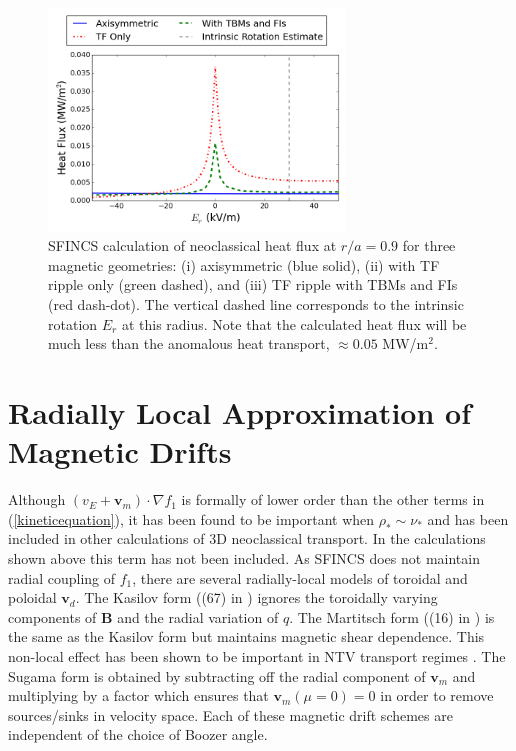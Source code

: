 \documentclass{article}
\begin{document}
\begin{figure}[h!]
\centering
\includegraphics[width=0.7\textwidth]
{HeatFlux.png}
\caption{\label{fig:HeatFlux} SFINCS calculation of neoclassical heat flux at $r/a = 0.9$ for three magnetic geometries: (i) axisymmetric (blue solid), (ii) with TF ripple only (green dashed), and (iii) TF ripple with TBMs and FIs (red dash-dot). The vertical dashed line corresponds to the intrinsic rotation $E_r$ at this radius. Note that the calculated heat flux will be much less than the anomalous heat transport, $\approx 0.05$ MW/m$^2$. }
\end{figure}

\FloatBarrier

\section{Radially Local Approximation of Magnetic Drifts}\label{mds}
Although $(v_E + \bm{v}_m) \cdot \nabla f_1$ is formally of lower order than the other terms in (\ref{kineticequation}), it has been found to be important when $\rho_* \sim \nu_*$ and has been included in other calculations of 3D neoclassical transport. In the calculations shown above this term has not been included. 
 As SFINCS does not maintain radial coupling of $f_1$, there are several radially-local models of toroidal and poloidal $\bm{v}_d$.  The Kasilov form ((67) in \cite{Kasilov2014}) ignores the toroidally varying components of $\bm{B}$ and the radial variation of $q$. The Martitsch form ((16) in \cite{Martitsch2016}) is the same as the Kasilov form but maintains magnetic shear dependence. This non-local effect has been shown to be important in NTV transport regimes \cite{Martitsch2016}. The Sugama form is obtained by subtracting off the radial component of $\bm{v}_m$ and multiplying by a factor which ensures that $\bm{v}_m (\mu = 0)  = 0$ in order to remove sources/sinks in velocity space. Each of these magnetic drift schemes are independent of the choice of Boozer angle. 
\end{document}
